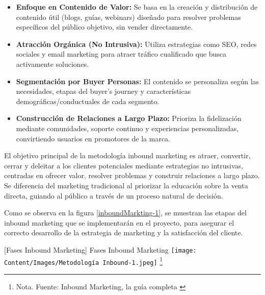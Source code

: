 \begin{itemize}
    \item \textbf{Enfoque en Contenido de Valor:} Se basa en la creación y distribución de contenido útil (blogs, guías, webinars) diseñado para resolver problemas específicos del público objetivo, sin vender directamente.
    \item \textbf{Atracción Orgánica (No Intrusiva):} Utiliza estrategias como SEO, redes sociales y email marketing para atraer tráfico cualificado que busca activamente soluciones.
    \item \textbf{Segmentación por Buyer Personas:} El contenido se personaliza según las necesidades, etapas del buyer's journey y características demográficas/conductuales de cada segmento.
    \item \textbf{Construcción de Relaciones a Largo Plazo:} Prioriza la fidelización mediante comunidades, soporte continuo y experiencias personalizadas, convirtiendo usuarios en promotores de la marca.
\end{itemize}
El objetivo principal de la metodología inbound marketing es atraer, convertir, cerrar y deleitar a los clientes potenciales mediante estrategias no intrusivas, centradas en ofrecer valor, resolver problemas y construir relaciones a largo plazo. Se diferencia del marketing tradicional al priorizar la educación sobre la venta directa, guiando al público a través de un proceso natural de decisión.

Como se observa en la figura \ref{inboundMarkting-1}, se muestran las etapas del inbound marketing que se implementarán en el proyecto, para asegurar el correcto desarrollo de la estrategia de marketing y la satisfacción del cliente.

\vspace{2mm}
        \begin{minipage}{0.9\textwidth}
        \centering
        [{Fases Inbound Marketing}]{ Fases Inbound Marketing  }
        \label{inboundMarkting-1}
         \texttt{[image: Content/Images/Metodología Inbound-1.jpeg]}
        \footnote{Nota. \textup{Fuente: Inbound Marketing, la guía completa \cite{InboundMarketing}}}
\end{minipage}

